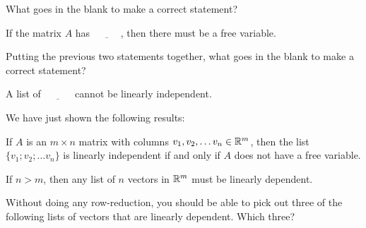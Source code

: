 \edXsolution{ 
}
\endedxproblem



What goes in the blank to make a correct statement?

If the matrix $A$ has $\underline{\;\;\;\;\;\;\;\;\;\;}$, then
there must be a free variable.  


\edXsolution{ 
}
\endedxproblem



Putting the previous two statements together, what goes in the blank to make a correct statement?  

A list of  $\underline{\;\;\;\;\;\;\;\;\;\;}$ cannot be linearly independent.


\edXsolution{ 
}
\endedxproblem




\endedxvertical





We have just shown the following results:  

If $A$ is an $m\times n$ matrix with columns 
$v_1, v_2, \ldots v_n \in \mathbb R^m$, then the list $\{v_1; v_2; \ldots v_n\}$ is linearly independent
if and only if $A$ does not have a free variable.  

If $n>m$, then any list of $n$ vectors in $\mathbb R^m$ must be linearly dependent.  


\endedxtext






Without doing any row-reduction, you should be able to pick out three of the 
following lists of vectors that are linearly dependent.  Which three?  

